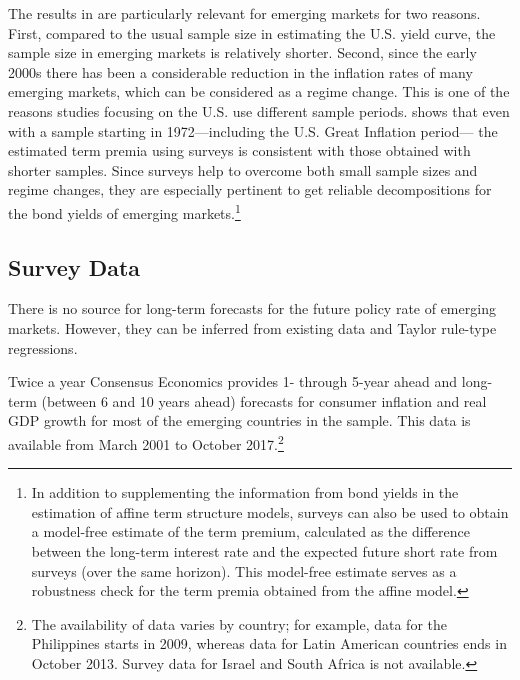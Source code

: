 {The results in \cite{Guimaraes:2014} are particularly relevant for emerging markets for two reasons. 
First, compared to the usual sample size in estimating the U.S. yield curve, the sample size in emerging markets is relatively shorter.
Second, since the early 2000s there has been a considerable reduction in the inflation rates of many emerging markets, which can be considered as a regime change. 
This is one of the reasons studies focusing on the U.S. use different sample periods.
\cite{Guimaraes:2014} shows that even with a sample starting in 1972---including the U.S. Great Inflation period--- the estimated term premia using surveys is consistent with those obtained with shorter samples.
Since surveys help to overcome both small sample sizes and regime changes, they are especially pertinent to get reliable decompositions for the bond yields of emerging markets.\footnote{ In addition to supplementing the information from bond yields in the estimation of affine term structure models, surveys can also be used to obtain a model-free estimate of the term premium, calculated as the difference between the long-term interest rate and the expected future short rate from surveys (over the same horizon). This model-free estimate serves as a robustness check for the term premia obtained from the affine model.}
 

\subsection{Survey Data} \label{sec:SurveyData}
\iftoggle{toclinks}{\gototoc}{} %

There is no source for long-term forecasts for the future policy rate of emerging markets. However, they can be inferred from existing data and Taylor rule-type regressions.

Twice a year Consensus Economics provides 1- through 5-year ahead and long-term (between 6 and 10 years ahead) forecasts for consumer inflation and real GDP growth for most of the emerging countries in the sample. This data is available from March 2001 to October 2017.\footnote{ The availability of data varies by country; for example, data for the Philippines starts in 2009, whereas data for Latin American countries ends in October 2013. Survey data for Israel and South Africa is not available.}

}
